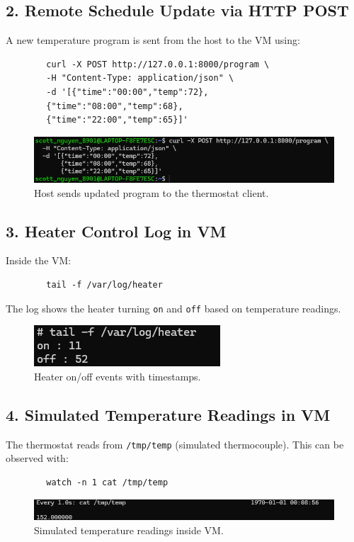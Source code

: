 \documentclass[12pt]{article}
\begin{document}
	\subsection{2. Remote Schedule Update via HTTP POST}
	A new temperature program is sent from the host to the VM using:
	\begin{verbatim}
		curl -X POST http://127.0.0.1:8000/program \
		-H "Content-Type: application/json" \
		-d '[{"time":"00:00","temp":72},
		{"time":"08:00","temp":68},
		{"time":"22:00","temp":65}]'
	\end{verbatim}
	\begin{figure}[h!]
		\centering
		\includegraphics[width=0.85\linewidth]{curl-post.png}
		\caption{Host sends updated program to the thermostat client.}
	\end{figure}
	
	\subsection{3. Heater Control Log in VM}
	Inside the VM:
	\begin{verbatim}
		tail -f /var/log/heater
	\end{verbatim}
	The log shows the heater turning \texttt{on} and \texttt{off} based on temperature readings.
	\begin{figure}[h!]
		\centering
		\includegraphics[width=0.5\linewidth]{heater.png}
		\caption{Heater on/off events with timestamps.}
	\end{figure}
	
	\subsection{4. Simulated Temperature Readings in VM}
	The thermostat reads from \texttt{/tmp/temp} (simulated thermocouple). This can be observed with:
	\begin{verbatim}
		watch -n 1 cat /tmp/temp
	\end{verbatim}
	\begin{figure}[h!]
		\centering
		\includegraphics[width=0.65\linewidth]{watch-cat-temp.png}
		\caption{Simulated temperature readings inside VM.}
	\end{figure}
	
\end{document}
